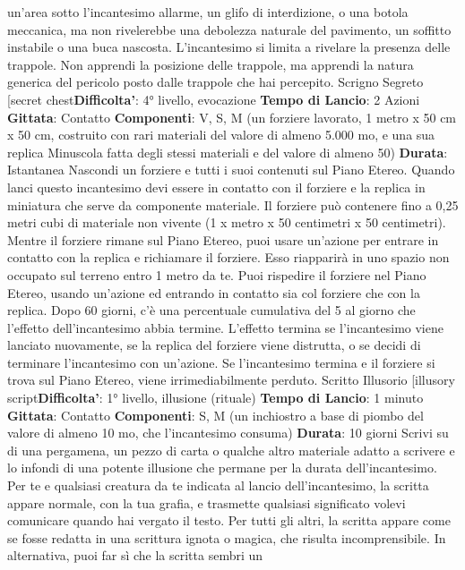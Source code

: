 \begin{multicols}{2}
un’area sotto l’incantesimo allarme, un glifo di
interdizione, o una botola meccanica, ma non
rivelerebbe una debolezza naturale del pavimento, un
soffitto instabile o una buca nascosta.
L’incantesimo si limita a rivelare la presenza delle
trappole. Non apprendi la posizione delle trappole, ma
apprendi la natura generica del pericolo posto dalle
trappole che hai percepito.
Scrigno Segreto
[secret chest\textbf{Difficolta'}:
4° livello, evocazione
\textbf{Tempo di Lancio}: 2 Azioni
\textbf{Gittata}: Contatto
\textbf{Componenti}: V, S, M (un forziere lavorato, 1 metro x
50 cm x 50 cm, costruito con rari materiali del valore di
almeno 5.000 mo, e una sua replica Minuscola fatta
degli stessi materiali e del valore di almeno 50)
\textbf{Durata}: Istantanea
Nascondi un forziere e tutti i suoi contenuti sul Piano
Etereo. Quando lanci questo incantesimo devi essere in
contatto con il forziere e la replica in miniatura che
serve da componente materiale. Il forziere può
contenere fino a 0,25 metri cubi di materiale non
vivente (1 x metro x 50 centimetri x 50 centimetri).
Mentre il forziere rimane sul Piano Etereo, puoi usare
un’azione per entrare in contatto con la replica e
richiamare il forziere. Esso riapparirà in uno spazio non
occupato sul terreno entro 1 metro da te. Puoi
rispedire il forziere nel Piano Etereo, usando un’azione
ed entrando in contatto sia col forziere che con la
replica.
Dopo 60 giorni, c’è una percentuale cumulativa del 5%
al giorno che l’effetto dell’incantesimo abbia termine.
L’effetto termina se l’incantesimo viene lanciato
nuovamente, se la replica del forziere viene distrutta, o
se decidi di terminare l’incantesimo con un’azione. Se
l’incantesimo termina e il forziere si trova sul Piano
Etereo, viene irrimediabilmente perduto.
Scritto Illusorio
[illusory script\textbf{Difficolta'}:
1° livello, illusione (rituale)
\textbf{Tempo di Lancio}: 1 minuto
\textbf{Gittata}: Contatto
\textbf{Componenti}: S, M (un inchiostro a base di piombo del
valore di almeno 10 mo, che l’incantesimo consuma)
\textbf{Durata}: 10 giorni
Scrivi su di una pergamena, un pezzo di carta o
qualche altro materiale adatto a scrivere e lo infondi di
una potente illusione che permane per la durata
dell’incantesimo.
Per te e qualsiasi creatura da te indicata al lancio
dell’incantesimo, la scritta appare normale, con la tua
grafia, e trasmette qualsiasi significato volevi
comunicare quando hai vergato il testo. Per tutti gli altri,
la scritta appare come se fosse redatta in una scrittura
ignota o magica, che risulta incomprensibile. In
alternativa, puoi far sì che la scritta sembri un

\end{multicols}
